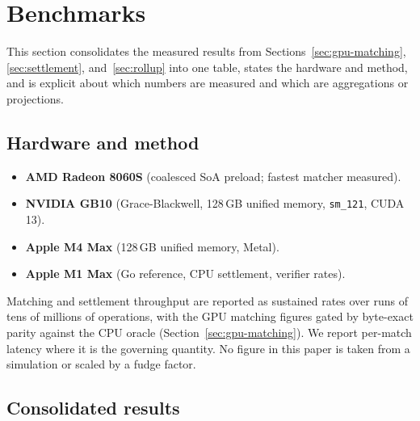 \section{Benchmarks}
\label{sec:benchmarks}

This section consolidates the measured results from Sections~\ref{sec:gpu-matching},
\ref{sec:settlement}, and~\ref{sec:rollup} into one table, states the hardware and method,
and is explicit about which numbers are measured and which are aggregations or projections.

\subsection{Hardware and method}

\begin{itemize}
  \item \textbf{AMD Radeon 8060S} (coalesced SoA preload; fastest matcher measured).
  \item \textbf{NVIDIA GB10} (Grace-Blackwell, 128\,GB unified memory, \texttt{sm\_121},
  CUDA 13).
  \item \textbf{Apple M4 Max} (128\,GB unified memory, Metal).
  \item \textbf{Apple M1 Max} (Go reference, CPU settlement, verifier rates).
\end{itemize}

Matching and settlement throughput are reported as sustained rates over runs of tens of
millions of operations, with the GPU matching figures gated by byte-exact parity against the
CPU oracle (Section~\ref{sec:gpu-matching}). We report per-match latency where it is the
governing quantity. No figure in this paper is taken from a simulation or scaled by a fudge
factor.

\subsection{Consolidated results}

